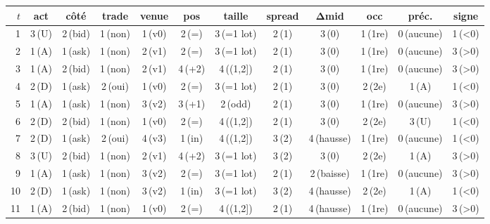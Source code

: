 \begin{tabular}{rccccccccccc}
\toprule
$t$ & act & côté & trade & venue & pos & taille & spread & Δmid & occ & préc. & signe\\
\midrule
1 & 3\,{\tiny(U)} & 2\,{\tiny(bid)} & 1\,{\tiny(non)} & 1\,{\tiny(v0)} & 2\,{\tiny(=)} & 3\,{\tiny(=1 lot)} & 2\,{\tiny(1)} & 3\,{\tiny(0)} & 1\,{\tiny(1re)} & 0\,{\tiny(aucune)} & 1\,{\tiny(<0)}\\
2 & 1\,{\tiny(A)} & 1\,{\tiny(ask)} & 1\,{\tiny(non)} & 2\,{\tiny(v1)} & 2\,{\tiny(=)} & 3\,{\tiny(=1 lot)} & 2\,{\tiny(1)} & 3\,{\tiny(0)} & 1\,{\tiny(1re)} & 0\,{\tiny(aucune)} & 3\,{\tiny(>0)}\\
3 & 1\,{\tiny(A)} & 2\,{\tiny(bid)} & 1\,{\tiny(non)} & 2\,{\tiny(v1)} & 4\,{\tiny(+2)} & 4\,{\tiny((1,2])} & 2\,{\tiny(1)} & 3\,{\tiny(0)} & 1\,{\tiny(1re)} & 0\,{\tiny(aucune)} & 3\,{\tiny(>0)}\\
4 & 2\,{\tiny(D)} & 1\,{\tiny(ask)} & 2\,{\tiny(oui)} & 1\,{\tiny(v0)} & 2\,{\tiny(=)} & 3\,{\tiny(=1 lot)} & 2\,{\tiny(1)} & 3\,{\tiny(0)} & 2\,{\tiny(2e)} & 1\,{\tiny(A)} & 1\,{\tiny(<0)}\\
5 & 1\,{\tiny(A)} & 1\,{\tiny(ask)} & 1\,{\tiny(non)} & 3\,{\tiny(v2)} & 3\,{\tiny(+1)} & 2\,{\tiny(odd)} & 2\,{\tiny(1)} & 3\,{\tiny(0)} & 1\,{\tiny(1re)} & 0\,{\tiny(aucune)} & 3\,{\tiny(>0)}\\
6 & 2\,{\tiny(D)} & 2\,{\tiny(bid)} & 1\,{\tiny(non)} & 1\,{\tiny(v0)} & 2\,{\tiny(=)} & 4\,{\tiny((1,2])} & 2\,{\tiny(1)} & 3\,{\tiny(0)} & 2\,{\tiny(2e)} & 3\,{\tiny(U)} & 1\,{\tiny(<0)}\\
7 & 2\,{\tiny(D)} & 1\,{\tiny(ask)} & 2\,{\tiny(oui)} & 4\,{\tiny(v3)} & 1\,{\tiny(in)} & 4\,{\tiny((1,2])} & 3\,{\tiny(2)} & 4\,{\tiny(hausse)} & 1\,{\tiny(1re)} & 0\,{\tiny(aucune)} & 1\,{\tiny(<0)}\\
8 & 3\,{\tiny(U)} & 2\,{\tiny(bid)} & 1\,{\tiny(non)} & 2\,{\tiny(v1)} & 4\,{\tiny(+2)} & 3\,{\tiny(=1 lot)} & 3\,{\tiny(2)} & 3\,{\tiny(0)} & 2\,{\tiny(2e)} & 1\,{\tiny(A)} & 3\,{\tiny(>0)}\\
9 & 1\,{\tiny(A)} & 1\,{\tiny(ask)} & 1\,{\tiny(non)} & 3\,{\tiny(v2)} & 2\,{\tiny(=)} & 3\,{\tiny(=1 lot)} & 2\,{\tiny(1)} & 2\,{\tiny(baisse)} & 1\,{\tiny(1re)} & 0\,{\tiny(aucune)} & 3\,{\tiny(>0)}\\
10 & 2\,{\tiny(D)} & 1\,{\tiny(ask)} & 1\,{\tiny(non)} & 3\,{\tiny(v2)} & 1\,{\tiny(in)} & 3\,{\tiny(=1 lot)} & 3\,{\tiny(2)} & 4\,{\tiny(hausse)} & 2\,{\tiny(2e)} & 1\,{\tiny(A)} & 1\,{\tiny(<0)}\\
11 & 1\,{\tiny(A)} & 2\,{\tiny(bid)} & 1\,{\tiny(non)} & 1\,{\tiny(v0)} & 2\,{\tiny(=)} & 4\,{\tiny((1,2])} & 2\,{\tiny(1)} & 4\,{\tiny(hausse)} & 1\,{\tiny(1re)} & 0\,{\tiny(aucune)} & 3\,{\tiny(>0)}\\

\end{tabular}

